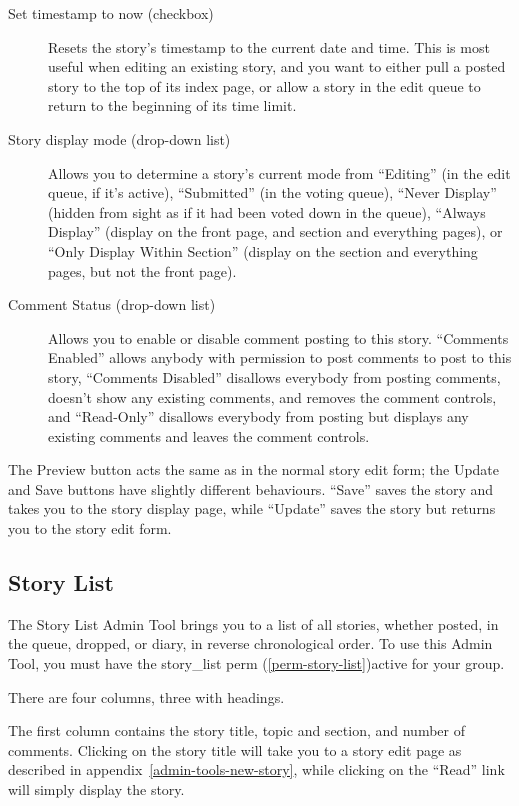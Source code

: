 \begin{description}
\item[Set timestamp to now (checkbox)] Resets the story's timestamp to the current date and time.  This is most useful when editing an existing story, and you want to either pull a posted story to the top of its index page, or allow a story in the edit queue to return to the beginning of its time limit.
\item[Story display mode (drop-down list)] Allows you to determine a story's current mode from ``Editing'' (in the edit queue, if it's active), ``Submitted'' (in the voting queue), ``Never Display'' (hidden from sight as if it had been voted down in the queue), ``Always Display'' (display on the front page, and section and everything pages), or ``Only Display Within Section'' (display on the section and everything pages, but not the front page).
\item[Comment Status (drop-down list)] Allows you to enable or disable comment posting to this story.  ``Comments Enabled'' allows anybody with permission to post comments to post to this story, ``Comments Disabled'' disallows everybody from posting comments, doesn't show any existing comments, and removes the comment controls, and ``Read-Only'' disallows everybody from posting but displays any existing comments and leaves the comment controls.
\end{description}

The Preview button acts the same as in the normal story edit form; the Update and Save buttons have slightly different behaviours.  ``Save'' saves the story and takes you to the story display page, while ``Update'' saves the story but returns you to the story edit form.

\subsection{Story List}
\label{admin-tools-story-list}

The Story List Admin Tool brings you to a list of all stories, whether posted, in the queue, dropped, or diary, in reverse chronological order.  To use this Admin Tool, you must have the story\_list perm (\ref{perm-story-list})active for your group.

There are four columns, three with headings.

The first column contains the story title, topic and section, and number of comments.  Clicking on the story title will take you to a story edit page as described in appendix~\ref{admin-tools-new-story}, while clicking on the ``Read'' link will simply display the story.

